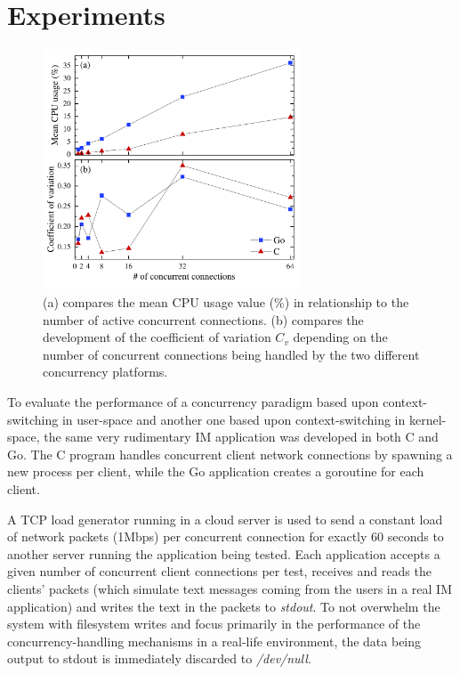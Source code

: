 \section{Experiments}
\begin{figure}[!t]
	\centering
	\includegraphics[width=3in]{img/experiments.pdf}
	\caption{(a) compares the mean CPU usage value (\%) in relationship to the number of active concurrent connections. (b) compares the development of the coefficient of variation $C_v$ depending on the number of concurrent connections being handled by the two different concurrency platforms.}
	\label{fig_results}
\end{figure}
To evaluate the performance of a concurrency paradigm based upon context-switching in user-space and another one based upon context-switching in kernel-space, the same very rudimentary IM application was developed in both C and Go. The C program handles concurrent client network connections by spawning a new process per client, while the Go application creates a goroutine for each client. 

A TCP load generator running in a cloud server is used to send a constant load of network packets (1Mbps) per concurrent connection for exactly 60 seconds to another server running the application being tested. Each application accepts a given number of concurrent client connections per test, receives and reads the clients' packets (which simulate text messages coming from the users in a real IM application) and writes the text in the packets to \textit{stdout}. To not overwhelm the system with filesystem writes and focus primarily in the performance of the concurrency-handling mechanisms in a real-life environment, the data being output to stdout is immediately discarded to \textit{/dev/null}. 

